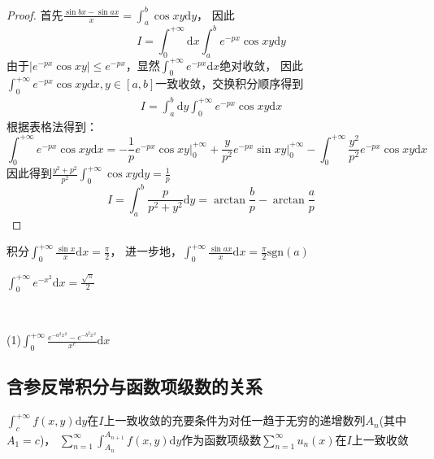 \begin{proof}
  首先$\frac{\sin bx - \sin ax}{x} = \int_a^b \cos xy \mathrm{d} y$，
  因此
  \begin{equation*}
    I = \int_0^{+\infty} \mathrm{d} x \int _a^b e^{-px}\cos xy \mathrm{d} y
  \end{equation*}
  由于$|e^{-px}\cos xy| \leq e^{-px}$，显然$\int_0^{+\infty} e^{-px}\mathrm{d} x$绝对收敛，
  因此$\int_0^{+\infty}e^{-px}\cos xy\mathrm{d}x, y \in [a,b]$一致收敛，交换积分顺序得到
  \begin{align*}
    I = \int_a^b \mathrm{d} y \int_0^{+\infty} e^{-px} \cos xy \mathrm{d} x
  \end{align*}
  根据表格法得到：
  \begin{equation*}
    \int_0^{+\infty} e^{-px}\cos xy \mathrm{d} x = - \frac{1}{p} e^{-px}\cos xy   \bigg|^{+\infty}_0 + \frac{y}{p^2} e^{-px} \sin xy   \bigg|_0^{+\infty} - \int_0^{+\infty} \frac{y^2}{p^2} e^{-px} \cos xy\mathrm{d} x 
  \end{equation*}
  因此得到$\frac{y^2 + p^2}{p^2} \int _0^{+\infty} \cos xy\mathrm{d} y = \frac{1}{p}$
  \begin{equation*}
    I = \int_a^b \frac{p}{p^2 + y^2}\mathrm{d} y = \arctan \frac{b}{p} - \arctan \frac{a}{p}
  \end{equation*}
\end{proof}


\begin{theorem}[Dirichlet积分]
  积分$\int _0^{+\infty} \frac{\sin x}{x} \mathrm{d} x = \frac{\pi}{2}$，
  进一步地，$\int_0^{+\infty} \frac{\sin ax}{x}\mathrm{d} x = \frac{\pi}{2} \text{sgn}(a)$
\end{theorem}

\begin{theorem}[正态积分公式]
  $\int_0^{+\infty} e^{-x^2}\mathrm{d} x = \frac{\sqrt{\pi}}{2}$
\end{theorem}

~

\begin{exercise}[相关练习]
  (1)$\int_0^{+\infty} \frac{e^{-a^2x^2} - e^{-b^2x^2} }{x^e}\mathrm{d} x$
\end{exercise}



\subsection{含参反常积分与函数项级数的关系}

\begin{theorem}
  $\int^{+\infty}_cf(x,y)\mathrm{d}y$在$I$上一致收敛的充要条件为对任一趋于无穷的递增数列$A_n$(其中$A_1 = c$)，
  $\sum\limits_{n = 1}^{\infty}\int^{A_{n+1}}_{A_n}f(x,y)\mathrm{d}y$作为函数项级数$\sum\limits_{n = 1}^{\infty}u_n(x)$在$I$上一致收敛
\end{theorem}

